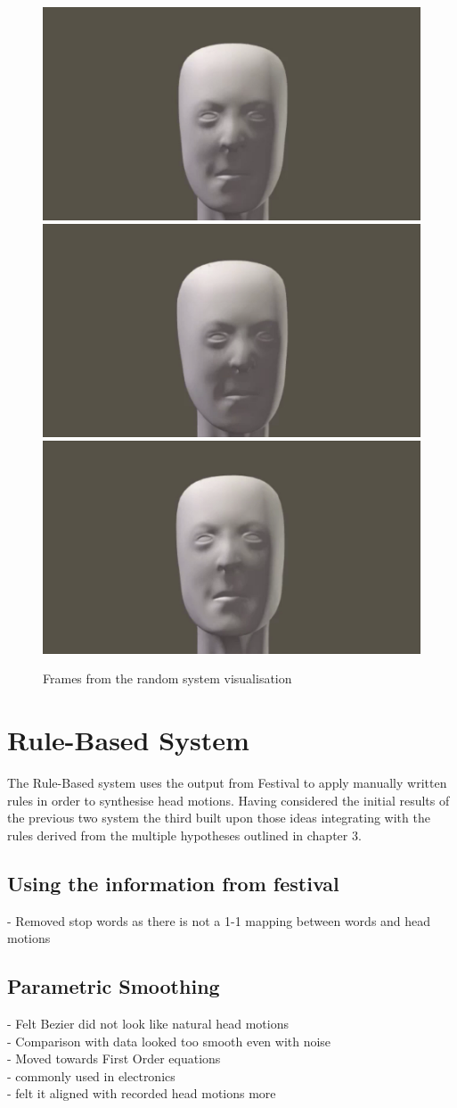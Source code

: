 \documentclass[bsc,frontabs,twoside,singlespacing,parskip]{infthesis}
\begin{document}
\begin{figure}
	\centering
	\includegraphics[width=.3\textwidth]{fightclub1.png}
	\includegraphics[width=.3\textwidth]{fightclub3.png}
	\includegraphics[width=.3\textwidth]{fightclub4.png}
	\caption{Frames from the random system visualisation}
\end{figure}

\section{Rule-Based System}

The Rule-Based system uses the output from Festival to apply manually written rules in order to synthesise head motions. Having considered the initial results of the previous two system the third built upon those ideas integrating with the rules derived from the multiple hypotheses outlined in chapter 3.

\subsection{Using the information from festival}

- Removed stop words as there is not a 1-1 mapping between words and head motions \\

\subsection{Parametric Smoothing}
- Felt Bezier did not look like natural head motions \\
- Comparison with data looked too smooth even with noise \\
- Moved towards First Order equations \\
- commonly used in electronics \\
- felt it aligned with recorded head motions more\\
\end{document}
